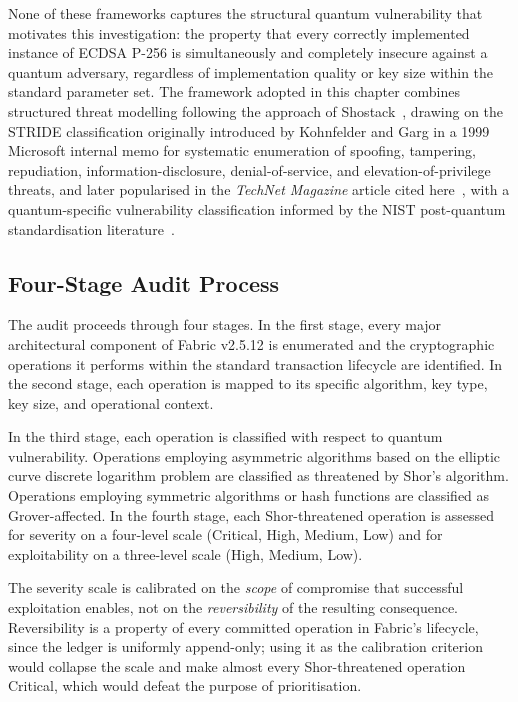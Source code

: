 \documentclass[conference]{IEEEtran}
\begin{document}
None of these frameworks captures the structural quantum vulnerability
that motivates this investigation: the property that every correctly
implemented instance of ECDSA P-256 is simultaneously and completely
insecure against a quantum adversary, regardless of implementation quality
or key size within the standard parameter set. The framework adopted in
this chapter combines structured threat modelling following the approach
of Shostack~\cite{shostack2014}, drawing on the STRIDE classification
originally introduced by Kohnfelder and Garg in a 1999 Microsoft
internal memo for systematic enumeration of spoofing, tampering,
repudiation, information-disclosure, denial-of-service, and
elevation-of-privilege threats, and later popularised in the
\textit{TechNet Magazine} article cited here~\cite{stride2004},
with a quantum-specific vulnerability classification informed by the
NIST post-quantum standardisation literature~\cite{nist_ir8105, bernstein2017pqc}.

\subsection{Four-Stage Audit Process}

The audit proceeds through four stages. In the first stage, every major
architectural component of Fabric v2.5.12 is enumerated and the
cryptographic operations it performs within the standard transaction
lifecycle are identified. In the second stage, each operation is mapped
to its specific algorithm, key type, key size, and operational context.

In the third stage, each operation is classified with respect to quantum
vulnerability. Operations employing asymmetric algorithms based on the
elliptic curve discrete logarithm problem are classified as threatened by
Shor's algorithm. Operations employing symmetric algorithms or hash
functions are classified as Grover-affected. In the fourth stage, each
Shor-threatened operation is assessed for severity on a four-level scale
(Critical, High, Medium, Low) and for exploitability on a three-level
scale (High, Medium, Low).

\label{sec:tm_severity}
The severity scale is calibrated on the \textit{scope} of compromise
that successful exploitation enables, not on the \textit{reversibility}
of the resulting consequence. Reversibility is a property of every
committed operation in Fabric's lifecycle, since the ledger is uniformly
append-only; using it as the calibration criterion would collapse the
scale and make almost every Shor-threatened operation Critical, which
would defeat the purpose of prioritisation.
\end{document}
